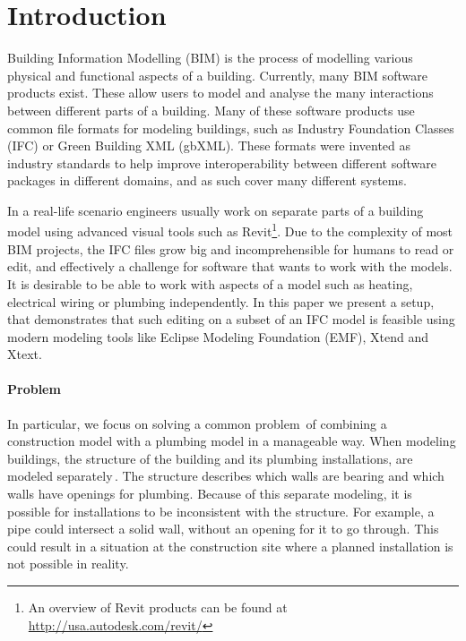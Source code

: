 

\setcounter{page}{1}
\section{Introduction}
Building Information Modelling (BIM) is the process of modelling various physical and functional aspects of a building. Currently, many BIM software products exist. These allow users to model and analyse the many interactions between different parts of a building. Many of these software products use common file formats for modeling buildings, such as Industry Foundation Classes (IFC) or Green Building XML (gbXML). These formats were invented as industry standards to help improve interoperability between different software packages in different domains, and as such cover many different systems.

In a real-life scenario engineers usually work on separate parts of a building model using advanced visual tools such as Revit\footnote{An overview of Revit products can be found at \url{http://usa.autodesk.com/revit/}}. Due to the complexity of most BIM projects, the IFC files grow big and incomprehensible for humans to read or edit, and effectively a challenge for software that wants to work with the models. It is desirable to be able to work with aspects of a model such as heating, electrical wiring or plumbing independently. In this paper we present a setup, that demonstrates that such editing on a subset of an IFC model is feasible using modern modeling tools like Eclipse Modeling Foundation (EMF), Xtend and Xtext.

\paragraph{Problem}
In particular, we focus on solving a common problem\,\cite[pp. 20]{jorgensen10} of combining a construction model with a plumbing model in a manageable way. When modeling buildings, the structure of the building and its plumbing installations, are modeled separately\,\cite[pp. 19--20]{jorgensen10}. The structure describes which walls are bearing and which walls have openings for plumbing.  Because of this separate modeling, it is possible for installations to be inconsistent with the structure. For example, a pipe could intersect a solid wall, without an opening for it to go through. This could result in a situation at the construction site where a planned installation is not possible in reality. 

